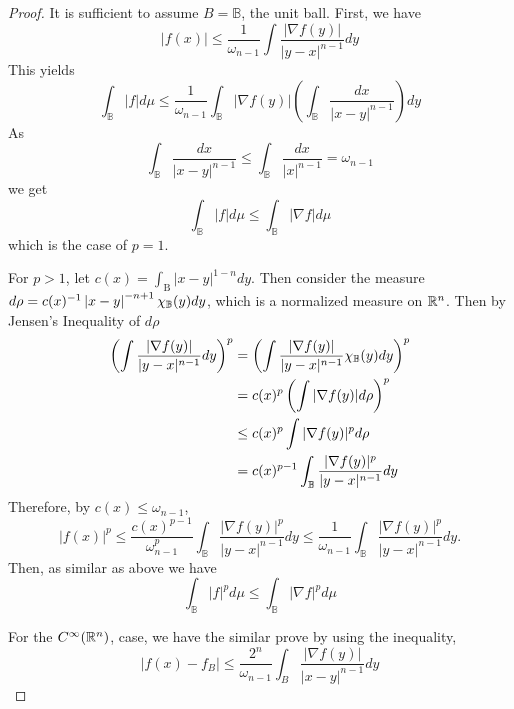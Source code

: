 \begin{proof}
	It is sufficient to assume $B = \mathbb{B}$, the unit ball. First, we have
	\begin{equation*}
		|f(x)| \leq \frac{1}{\omega_{n-1}} \int \frac{|\nabla f(y)|}{|y-x|^{n-1}} d y
	\end{equation*}
	This yields
	\begin{equation*}
		\int_{\mathbb{B}}|f| d \mu \leq \frac{1}{\omega_{n-1}} \int_{\mathbb{B}}|\nabla f(y)|\left(\int_{\mathbb{B}} \frac{d x}{|x-y|^{n-1}}\right) d y
	\end{equation*}
	As
	\begin{equation*}
		\int_{\mathbb{B}} \frac{d x}{|x-y|^{n-1}} \leq \int_{\mathbb{B}} \frac{d x}{|x|^{n-1}}=\omega_{n-1}
	\end{equation*}
	we get
	\begin{equation*}
		\int_{\mathbb{B}}|f| d \mu \leq \int_{\mathbb{B}}|\nabla f| d \mu
	\end{equation*}
	which is the case of $p = 1$.

	\noindent For $p > 1$, let $c(x) = \int_{\mathrm{B}}|x-y|^{1-n} d y$. Then consider the measure $d\rho = c(x)^{-1}\left\lvert x-y\right\lvert^{-n+1}\chi_{\mathbb{B}}(y)dy$, which is a normalized measure on $\mathbb{R}^n$. Then by Jensen's Inequality of $d\rho$
	\begin{equation*}
		\begin{aligned}
			\left(\int \frac{|\nabla f(y)|}{|y-x|^{n-1}} d y\right)^p &= \left(\int \frac{|\nabla f(y)|}{|y-x|^{n-1}}\chi_{\mathbb{B}}(y) d y\right)^p \\
			&= c(x)^p\left(\int {|\nabla f(y)|}d\rho\right)^p \\
			&\leq c(x)^p \int |\nabla f(y)|^p d\rho \\
			&= c(x)^{p-1} \int_{\mathbb{B}} \frac{|\nabla f(y)|^p}{|y-x|^{n-1}}dy
		\end{aligned}
	\end{equation*}
	Therefore, by $c(x) \leq \omega_{n-1}$,
	\begin{equation*}
		|f(x)|^p \leq \frac{c(x)^{p-1}}{\omega_{n-1}^p} \int_{\mathbb{B}} \frac{|\nabla f(y)|^p}{|y-x|^{n-1}} d y \leq \frac{1}{\omega_{n-1}} \int_{\mathbb{B}} \frac{|\nabla f(y)|^p}{|y-x|^{n-1}} d y .
	\end{equation*}
	Then, as similar as above we have
	\begin{equation*}
		\int_{\mathbb{B}}|f|^p d \mu \leq \int_{\mathbb{B}}|\nabla f|^p d \mu
	\end{equation*}

	\noindent For the $C^\infty(\mathbb{R}^n)$, case, we have the similar prove by using the inequality,
	\begin{equation*}
		\left|f(x)-f_B\right| \leq \frac{2^n}{\omega_{n-1}} \int_B \frac{|\nabla f(y)|}{|x-y|^{n-1}} d y
	\end{equation*}
\end{proof}

